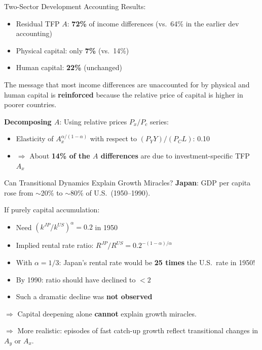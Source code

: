 \documentclass[blue]{beamer}
\begin{document}
\begin{frame}{Two-Sector Development Accounting}
	Results:
	\begin{itemize}
		\item Residual TFP $A$: \textbf{72\%} of income differences (vs.\ 64\% in the earlier dev accounting)
		\item Physical capital: only \textbf{7\%} (vs.\ 14\%)
		\item Human capital: \textbf{22\%} (unchanged)
	\end{itemize}
	
	The message that most income differences are unaccounted for by physical and human capital is \textbf{reinforced} because the relative price of capital is higher in poorer countries.
	
	\bigskip
	\textbf{Decomposing $A$}: Using relative prices $P_x/P_c$ series:
	\begin{itemize}
		\item Elasticity of $A_x^{\alpha/(1-\alpha)}$ with respect to $(P_YY)/(P_C L)$: 0.10
		\item $\Rightarrow$ About \textbf{14\% of the $A$ differences} are due to investment-specific TFP $A_x$
	\end{itemize}
\end{frame}


\begin{frame}{Can Transitional Dynamics Explain Growth Miracles?}
	\textbf{Japan}: GDP per capita rose from $\sim$20\% to $\sim$80\% of U.S.\ (1950--1990).
	
	\bigskip
	If purely capital accumulation:
	\begin{itemize}
		\item Need $(k^{JP}/k^{US})^\alpha = 0.2$ in 1950
		\item Implied rental rate ratio: $R^{JP}/R^{US} = 0.2^{-(1-\alpha)/\alpha}$
		\item With $\alpha = 1/3$: Japan's rental rate would be \textbf{25 times} the U.S.\ rate in 1950!
		\item By 1990: ratio should have declined to $< 2$ 
		\item Such a dramatic decline was \textbf{not observed}
	\end{itemize}
	
	\bigskip
	$\Rightarrow$ Capital deepening alone \textbf{cannot} explain growth miracles.
	
	$\Rightarrow$ More realistic: episodes of fast catch-up growth reflect transitional changes in $A_y$ or $A_x$.
\end{frame}
\end{document}

